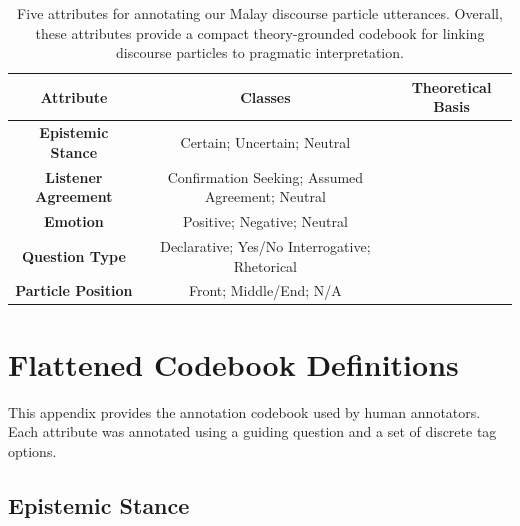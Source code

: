\documentclass[11pt]{article}
\begin{document}


\appendix

\begin{table}[t]
    \centering
    \small
    \renewcommand{\arraystretch}{1.1} %
    \begin{tabular}{c|c|c}
        \toprule
        \textbf{Attribute} & \textbf{Classes} & \textbf{Theoretical Basis} \\
        \midrule
        \textbf{Epistemic Stance} & Certain; Uncertain; Neutral & ~\citet{karkkainen2003epistemic,grzech2021discourse}\\
        
        \textbf{Listener Agreement} & Confirmation Seeking; Assumed Agreement; Neutral & ~\citet{wouk1998solidarity,stalnaker2002common}\\
        
        \textbf{Emotion} & Positive; Negative; Neutral & ~\citet{caffi1994pragmatics, buechel-hahn-2017-emobank} \\ 

    
        \textbf{Question Type} & Declarative; Yes/No Interrogative; Rhetorical & \citet{hoogervorst2018utterance}\\
        
        \textbf{Particle Position} & Front; Middle/End; N/A & \citet{tay2016discourse} \\
        \bottomrule
    \end{tabular}
    \caption{Five attributes for annotating our Malay discourse particle utterances. Overall, these attributes provide a compact theory-grounded codebook for linking discourse particles to pragmatic interpretation.}
    \label{tab:flattened-pragmatic-codebook}
\end{table}
\section{Flattened Codebook Definitions}
\label{app:codebook}

This appendix provides the annotation codebook used by human annotators. Each attribute was annotated using a guiding question and a set of discrete tag options.

\subsection{Epistemic Stance}
\end{document}
